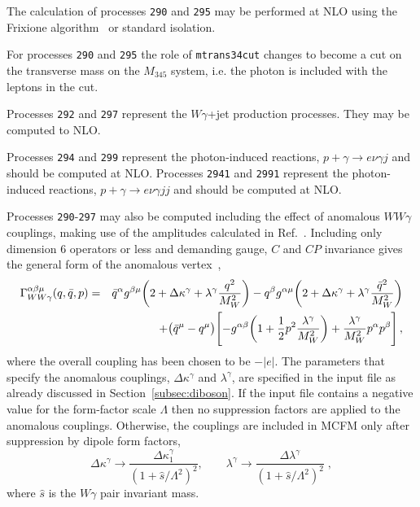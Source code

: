 The calculation of processes {\tt 290} and {\tt 295} may be performed
at NLO using the Frixione algorithm~\cite{Frixione:1998jh} or standard isolation. 

For processes {\tt 290} and {\tt 295} the role of {\tt mtrans34cut} changes to become a cut 
on the transverse mass on the $M_{345}$ system, i.e. the photon is included with the leptons in the cut. 

Processes {\tt 292} and {\tt 297} represent the $W\gamma$+jet production
processes.  They may be computed to NLO. 

Processes {\tt 294} and {\tt 299} represent the photon-induced reactions,
$p + \gamma \to e \nu \gamma j$ and should be computed at NLO. 
Processes {\tt 2941} and {\tt 2991} represent the photon-induced reactions,
$p + \gamma \to e \nu \gamma j j$ and should be computed at NLO. 

Processes {\tt 290}-{\tt 297} may also be computed including the effect of anomalous $WW\gamma$ couplings, making
use of the amplitudes calculated in Ref.~\cite{DeFlorian:2000sg}. Including only dimension 6 operators
or less and demanding gauge, $C$ and $CP$ invariance gives the general form of the anomalous 
vertex~\cite{DeFlorian:2000sg},
\begin{eqnarray}
 \Gamma^{\alpha \beta \mu}_{W W \gamma}(q, \bar q, p) &=& 
  {\bar q}^\alpha g^{\beta \mu} 
    \biggl( 2 + \Delta\kappa^\gamma + \lambda^\gamma {q^2\over M_W^2} \biggr) 
 - q^\beta g^{\alpha \mu}
    \biggl( 2 + \Delta\kappa^\gamma + \lambda^\gamma {{\bar q}^2\over M_W^2}
\biggr) \nonumber \\  
&& \hskip 1 cm
 + \bigl( {\bar q}^\mu - q^\mu \bigr) 
 \Biggl[ - g^{\alpha \beta} \biggl( 
   1 + {1\over2} p^2 \frac{\lambda^\gamma}{M_W^2} \biggr) 
 +\frac{\lambda^\gamma}{M_W^2} p^\alpha p^\beta \Biggr] \,,
\end{eqnarray}
where the overall coupling has been chosen to be $-|e|$. The parameters that
specify the anomalous couplings, $\Delta\kappa^\gamma$ and $\lambda^\gamma$, are
specified in the input file as already discussed in Section~\ref{subsec:diboson}.
If the input file contains a negative value for the form-factor scale $\Lambda$
then no suppression factors are applied to the anomalous couplings.
Otherwise, the couplings are included
in MCFM only after suppression by dipole form factors,
\begin{equation}
\Delta \kappa^{\gamma} \rightarrow
 \frac{\Delta \kappa_1^{\gamma}}{(1+\hat{s}/\Lambda^2)^2}, \qquad
\lambda^{\gamma} \rightarrow
 \frac{\Delta \lambda^{\gamma}}{(1+\hat{s}/\Lambda^2)^2} \;,
\end{equation}
where $\hat{s}$ is the $W\gamma$ pair invariant mass.

